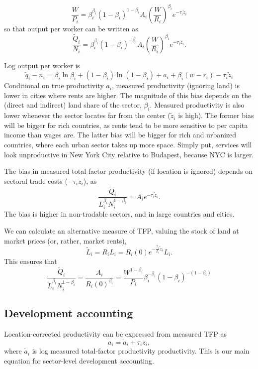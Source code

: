\documentclass[12pt]{article}
\begin{document}
\[
\frac{W}{P_i}  =\beta_i^{\beta_i}(1-\beta_i)^{1-\beta_i}
A_i
\left(\frac{W}{R_i}\right)^{\beta_i}
 e^{-\tau_i \tilde z_i}
\]
so that output per worker can be written as
\begin{equation}
\frac{\tilde Q_i}{N_i} = \beta_i^{\beta_i}(1-\beta_i)^{-\beta_i}
A_i
\left(\frac{W}{R_i}\right)^{\beta_i}e^{-\tau_i \tilde z_i}.
\end{equation}

Log output per worker is
\[
\tilde q_i - n_i =
\beta_i\ln\beta_i+(1-\beta_i)\ln(1-\beta_i)
+a_i +\beta_i (w
-r_i)
- \tau_{i}\tilde z_{i}
\]
Conditional on true productivity $a_i$, measured productivity (ignoring land) is lower in cities where rents are higher. The magnitude of this bias depends on the (direct and indirect) land share of the sector, $\beta_i$. Measured productivity is also lower whenever the sector locates far from the center ($\tilde z_i$ is high). %
The former bias will be bigger for rich countries, as rents tend to be more sensitive to per capita income than wages are. The latter bias will be bigger for rich and urbanized countries, where each urban sector takes up more space. Simply put, services will look unproductive in New York City relative to Budapest, because NYC is larger.

The bias in measured total factor productivity (if location is ignored) depends on sectoral trade costs ($-\tau_i\tilde z_i$), as 
\begin{equation}
\frac{\tilde Q_i}{L_i^{\beta_i}N_i^{1-\beta_i}} = A_i e^{-\tau_i \tilde z_i}.
\end{equation}
The bias is higher in non-tradable sectors, and in large countries and cities. 

We can calculate an alternative measure of TFP, valuing the stock of land at market prices (or, rather, market rents),
\[
\tilde L_i = R_iL_i = R_i(0)e^{-\frac{\tau_i}{\beta_i}\tilde z_i}L_i.
\]
This ensures that
\[
\frac{\tilde Q_i}{\tilde L_i^{\beta_i}N_i^{1-\beta_i}} = 
\frac{A_i}{R_i(0)^{\beta_i}}
= \frac{W^{1-\beta_i}}{P_i}\beta_i^{-\beta_i}(1-\beta_i)^{-(1-\beta_i)}
\]


\subsection{Development accounting} 
Location-corrected productivity can be expressed from measured TFP as
\[
a_i =  \tilde a_i+ \tau_{i}z_{i},
\]
where $\tilde a_i$ is log measured total-factor productivity productivity. This is our main equation for sector-level development accounting.
\end{document}

